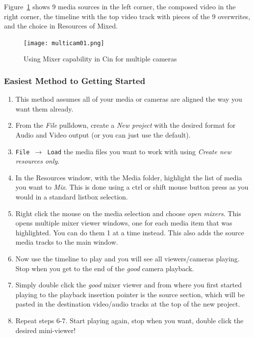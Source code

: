 Figure~\ref{fig:multicam01} shows 9 media sources in the left corner, the composed video in the right corner, the timeline with the top video track with pieces of the 9 overwrites, and the choice in Resources of Mixed.

\begin{figure}[htpb]
	\centering
	\texttt{[image: multicam01.png]}
	\caption{Using Mixer capability in Cin for multiple cameras}
	\label{fig:multicam01}
\end{figure}

\subsubsection*{Easiest Method to Getting Started}%
\label{ssub:easiest_method_started}

\begin{enumerate}
	\item This method assumes all of your media or cameras are aligned the way you want them already.
	\item From the \textit{File} pulldown, create a \textit{New project} with the desired format for Audio and Video output (or you can just use the default).
	\item \texttt{File $\rightarrow$ Load} the media files you want to work with using \textit{Create new resources only}.
	\item In the Resources window, with  the Media folder, highlight the list of media you want to \textit{Mix}. This is done using a ctrl or shift mouse button press as you would in a standard listbox selection.
	\item Right click the mouse on the media selection and choose \textit{open mixers}. This opens multiple mixer viewer windows, one for each media item that was highlighted.  You can
	do them 1 at a time instead.  This also adds the source media tracks to the main window.
	\item Now use the timeline to play and you will see all viewers/cameras playing.  Stop when you get to the
	end of the \textit{good} camera playback.
	\item Simply double click the \textit{good} mixer viewer and from where you first started playing to the playback insertion pointer is the source section, which will be pasted in the destination video/audio tracks at the top of the new project.
	\item Repeat steps 6-7.  Start playing again, stop when you want, double click the desired mini-viewer!
\end{enumerate}

